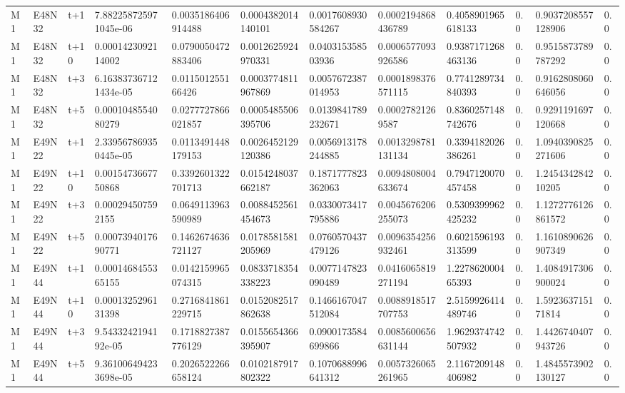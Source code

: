 \begin{landscape}
\begin{longtable}{llllllllllll}
M1 & E48N32 & t+1 & 7.882258725971045e-06 & 0.0035186406914488 & 0.0004382014140101 & 0.0017608930584267 & 0.0002194868436789 & 0.4058901965618133 & 0.0 & 0.9037208557128906 & 0.0 \\
M1 & E48N32 & t+10 & 0.0001423092114002 & 0.0790050472883406 & 0.0012625924970331 & 0.040315358503936 & 0.0006577093926586 & 0.9387171268463136 & 0.0 & 0.9515873789787292 & 0.0 \\
M1 & E48N32 & t+3 & 6.163837367121434e-05 & 0.011501255166426 & 0.0003774811967869 & 0.0057672387014953 & 0.0001898376571115 & 0.7741289734840393 & 0.0 & 0.9162808060646056 & 0.0 \\
M1 & E48N32 & t+5 & 0.0001048554080279 & 0.0277727866021857 & 0.0005485506395706 & 0.0139841789232671 & 0.00027821269587 & 0.8360257148742676 & 0.0 & 0.9291191697120668 & 0.0 \\
M1 & E49N22 & t+1 & 2.339567869350445e-05 & 0.0113491448179153 & 0.0026452129120386 & 0.0056913178244885 & 0.0013298781131134 & 0.3394182026386261 & 0.0 & 1.0940390825271606 & 0.0 \\
M1 & E49N22 & t+10 & 0.0015473667750868 & 0.3392601322701713 & 0.0154248037662187 & 0.1871777823362063 & 0.0094808004633674 & 0.7947120070457458 & 0.0 & 1.245434284210205 & 0.0 \\
M1 & E49N22 & t+3 & 0.000294507592155 & 0.0649113963590989 & 0.0088452561454673 & 0.0330073417795886 & 0.0045676206255073 & 0.5309399962425232 & 0.0 & 1.1272776126861572 & 0.0 \\
M1 & E49N22 & t+5 & 0.0007394017690771 & 0.1462674636721127 & 0.0178581581205969 & 0.0760570437479126 & 0.0096354256932461 & 0.6021596193313599 & 0.0 & 1.1610890626907349 & 0.0 \\
M1 & E49N44 & t+1 & 0.0001468455365155 & 0.0142159965074315 & 0.0833718354338223 & 0.0077147823090489 & 0.0416065819271194 & 1.227862000465393 & 0.0 & 1.4084917306900024 & 0.0 \\
M1 & E49N44 & t+10 & 0.0001325296131398 & 0.2716841861229715 & 0.0152082517862638 & 0.1466167047512084 & 0.0088918517707753 & 2.5159926414489746 & 0.0 & 1.592363715171814 & 0.0 \\
M1 & E49N44 & t+3 & 9.5433242194192e-05 & 0.1718827387776129 & 0.0155654366395907 & 0.0900173584699866 & 0.0085600656631144 & 1.9629374742507932 & 0.0 & 1.4426740407943726 & 0.0 \\
M1 & E49N44 & t+5 & 9.361006494233698e-05 & 0.2026522266658124 & 0.0102187917802322 & 0.1070688996641312 & 0.0057326065261965 & 2.1167209148406982 & 0.0 & 1.4845573902130127 & 0.0 \\

\end{longtable}
\end{landscape}
